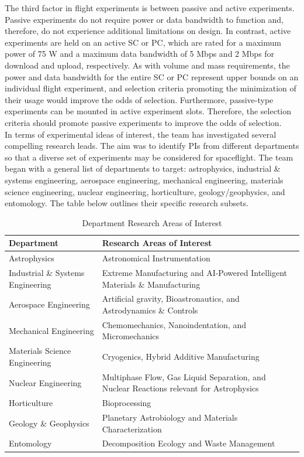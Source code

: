 \documentclass[conf]{new-aiaa}
\begin{document}
The third factor in flight experiments is between passive and active experiments.
Passive experiments do not require power or data bandwidth to function and, therefore, do not experience additional limitations on design.
In contrast, active experiments are held on an active SC or PC, which are rated for a maximum power of 75 W and a maximum data bandwidth of 5 Mbps and 2 Mbps for download and upload, respectively.
As with volume and mass requirements, the power and data bandwidth for the entire SC or PC represent upper bounds on an individual flight experiment, and selection criteria promoting the minimization of their usage would improve the odds of selection.
Furthermore, passive-type experiments can be mounted in active experiment slots.
Therefore, the selection criteria should promote passive experiments to improve the odds of selection. \\

In terms of experimental ideas of interest, the team has investigated several compelling research leads.
The aim was to identify PIs from different departments so that a diverse set of experiments may be considered for spaceflight.
The team began with a general list of departments to target: astrophysics, industrial \& systems engineering, aerospace engineering, mechanical engineering, materials science engineering, nuclear engineering, horticulture, geology/geophysics, and entomology.
The table below outlines their specific research subsets.

\begin{table}[!htbp]
    \centering
    \footnotesize
    \setlength{\tabcolsep}{4pt}
    \renewcommand{\arraystretch}{1.15}
    \begin{tabularx}{\textwidth}{@{}>{\raggedright\arraybackslash}p{4.0cm}X@{}}
    \toprule
    \textbf{Department} & \textbf{Research Areas of Interest} \\
    \midrule
    Astrophysics & Astronomical Instrumentation \\
    Industrial \& Systems Engineering & Extreme Manufacturing and AI-Powered Intelligent Materials \& Manufacturing \\
    Aerospace Engineering & Artificial gravity, Bioastronautics, and Astrodynamics \& Controls \\
    Mechanical Engineering & Chemomechanics, Nanoindentation, and Micromechanics \\
    Materials Science Engineering & Cryogenics, Hybrid Additive Manufacturing \\
    Nuclear Engineering & Multiphase Flow, Gas Liquid Separation, and Nuclear Reactions relevant for Astrophysics \\
    Horticulture & Bioprocessing \\
    Geology \& Geophysics & Planetary Astrobiology and Materials Characterization \\
    Entomology & Decomposition Ecology and Waste Management \\
    \bottomrule
    \end{tabularx}
    \caption{Department Research Areas of Interest}\label{tab:table4}
\end{table}
\end{document}
